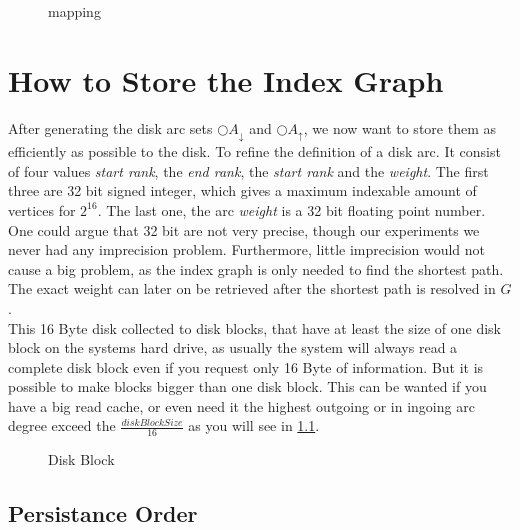\begin{figure}
    \centering
    
    \caption{mapping}
    \label{fig:mapping}
\end{figure}

\section{How to Store the Index Graph}

After generating the disk arc sets $\bigcirc A_\downarrow$ and $\bigcirc A_\uparrow$, we now want to store them as efficiently as possible to the disk. To refine the definition of a disk arc. It consist of four values \textit{start rank}, the \textit{end rank}, the \textit{start rank} and the \textit{weight}. The
first three are 32 bit signed integer, which gives a maximum indexable amount of vertices for $2^{16}$. The last one, the arc \textit{weight} is a 32 bit floating point number. One could argue that 32 bit are not very precise, though our experiments we never had any imprecision problem. Furthermore, little imprecision
would not cause a big problem, as the index graph is only needed to find the shortest path. The exact weight can later on be retrieved after the shortest path is resolved in $G$. 
\\
This 16 Byte disk collected to disk blocks, that have at least the size of one disk block on the systems hard drive, as usually the system will always read a complete disk block even if you request only 16 Byte of information. But it is possible to make blocks bigger than one disk block. This can be wanted if you have a big read cache,
or even need it the highest outgoing or in ingoing arc degree exceed the $\frac{diskBlockSize}{16}$ as you will see in \ref{sec:persistanceOrder}.

\begin{figure}
    \centering
    
    \caption{Disk Block}
    \label{fig:disk_block}
\end{figure}

\subsection{Persistance Order}\label{sec:persistanceOrder}

